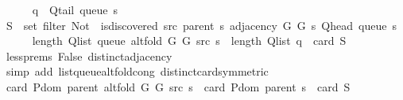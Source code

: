 \begin{isabellebody}
\ \ \ \ \isamarkupfalse%
\ {\isacharquery}{\kern0pt}q\ {\isacharequal}{\kern0pt}\ {\isachardoublequoteopen}Q{\isacharunderscore}{\kern0pt}tail\ {\isacharparenleft}{\kern0pt}queue\ s{\isacharparenright}{\kern0pt}{\isachardoublequoteclose}\isanewline
\ \ \ \ \isamarkupfalse%
\ {\isacharquery}{\kern0pt}S\ {\isacharequal}{\kern0pt}\ {\isachardoublequoteopen}set\ {\isacharparenleft}{\kern0pt}filter\ {\isacharparenleft}{\kern0pt}Not\ {\isasymcirc}\ is{\isacharunderscore}{\kern0pt}discovered\ src\ {\isacharparenleft}{\kern0pt}parent\ s{\isacharparenright}{\kern0pt}{\isacharparenright}{\kern0pt}\ {\isacharparenleft}{\kern0pt}adjacency\ G{}\ G{}\ s\ {\isacharparenleft}{\kern0pt}Q{\isacharunderscore}{\kern0pt}head\ {\isacharparenleft}{\kern0pt}queue\ s{\isacharparenright}{\kern0pt}{\isacharparenright}{\kern0pt}{\isacharparenright}{\kern0pt}{\isacharparenright}{\kern0pt}{\isachardoublequoteclose}\isanewline
\isanewline
\ \ \ \ \isamarkupfalse%
\ {\isachardoublequoteopen}length\ {\isacharparenleft}{\kern0pt}Q{\isacharunderscore}{\kern0pt}list\ {\isacharparenleft}{\kern0pt}queue\ {\isacharparenleft}{\kern0pt}alt{\isacharunderscore}{\kern0pt}fold\ G{}\ G{}\ src\ s{\isacharparenright}{\kern0pt}{\isacharparenright}{\kern0pt}{\isacharparenright}{\kern0pt}\ {\isacharequal}{\kern0pt}\ length\ {\isacharparenleft}{\kern0pt}Q{\isacharunderscore}{\kern0pt}list\ {\isacharquery}{\kern0pt}q{\isacharparenright}{\kern0pt}\ {\isacharplus}{\kern0pt}\ card\ {\isacharquery}{\kern0pt}S{\isachardoublequoteclose}\isanewline
\ \ \ \ \ \ \isamarkupfalse%
\ less{\isachardot}{\kern0pt}prems{\isacharparenleft}{\kern0pt}{}{\isacharminus}{\kern0pt}{}{\isacharparenright}{\kern0pt}\ False\ distinct{\isacharunderscore}{\kern0pt}adjacency\isanewline
\ \ \ \ \ \ \isamarkupfalse%
\ {\isacharparenleft}{\kern0pt}simp\ add{\isacharcolon}{\kern0pt}\ list{\isacharunderscore}{\kern0pt}queue{\isacharunderscore}{\kern0pt}alt{\isacharunderscore}{\kern0pt}fold{\isacharunderscore}{\kern0pt}cong\ distinct{\isacharunderscore}{\kern0pt}card{\isacharbrackleft}{\kern0pt}symmetric{\isacharbrackright}{\kern0pt}{\isacharparenright}{\kern0pt}\isanewline
\ \ \ \ \isamarkupfalse%
\ \isamarkupfalse%
\ {\isachardoublequoteopen}card\ {\isacharparenleft}{\kern0pt}P{\isachardot}{\kern0pt}dom\ {\isacharparenleft}{\kern0pt}parent\ {\isacharparenleft}{\kern0pt}alt{\isacharunderscore}{\kern0pt}fold\ G{}\ G{}\ src\ s{\isacharparenright}{\kern0pt}{\isacharparenright}{\kern0pt}{\isacharparenright}{\kern0pt}\ {\isacharequal}{\kern0pt}\ card\ {\isacharparenleft}{\kern0pt}P{\isachardot}{\kern0pt}dom\ {\isacharparenleft}{\kern0pt}parent\ s{\isacharparenright}{\kern0pt}{\isacharparenright}{\kern0pt}\ {\isacharplus}{\kern0pt}\ card\ {\isacharquery}{\kern0pt}S{\isachardoublequoteclose}\isanewline

\end{isabellebody}
